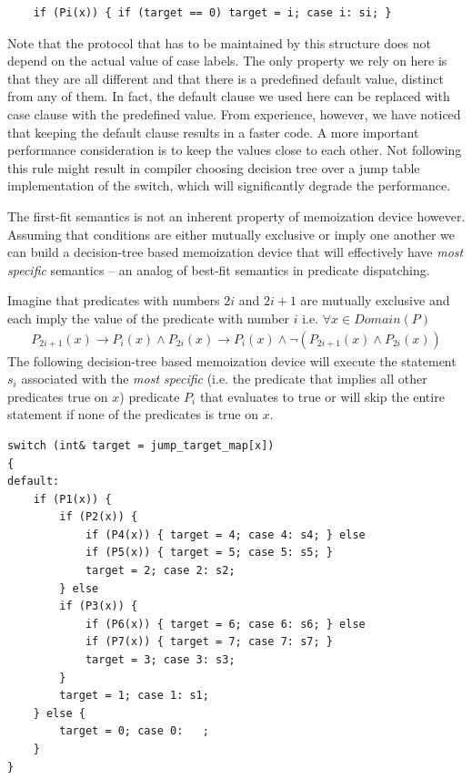 \documentclass[preprint]{sigplanconf}
\begin{document}
\begin{lstlisting}
    if (Pi(x)) { if (target == 0) target = i; case i: si; }
\end{lstlisting}

\noindent
Note that the protocol that has to be maintained by this structure does not 
depend on the actual value of case labels. The only property we rely on here is 
that they are all different and that there is a predefined default value, 
distinct from any of them. In fact, the default clause we used here can be 
replaced with case clause with the predefined value. From experience, however, 
we have noticed that keeping the default clause results in a faster code. A more 
important performance consideration is to keep the values close to each other. 
Not following this rule might result in compiler choosing decision tree over a 
jump table implementation of the switch, which will significantly degrade the 
performance.

The first-fit semantics is not an inherent property of memoization device however. 
Assuming that conditions are either mutually exclusive or imply one another we 
can build a decision-tree based memoization device that will effectively have 
\emph{most specific} semantics -- an analog of best-fit semantics in predicate 
dispatching\cite{ErnstKC98}.

Imagine that predicates with numbers $2i$ and $2i+1$ are mutually exclusive and 
each imply the value of the predicate with number $i$ i.e. $\forall x \in Domain(P)$
\begin{eqnarray*}
P_{2i+1}(x)\rightarrow P_i(x) \wedge P_{2i}(x)\rightarrow P_i(x) \wedge \neg(P_{2i+1}(x) \wedge P_{2i}(x))
\end{eqnarray*}
\noindent
The following decision-tree based memoization device will execute the statement 
$s_i$ associated with the \emph{most specific} (i.e. the predicate that implies 
all other predicates true on $x$) predicate $P_i$ that evaluates to true or will 
skip the entire statement if none of the predicates is true on $x$.

\begin{lstlisting}
switch (int& target = jump_target_map[x])
{
default:
    if (P1(x)) {
        if (P2(x)) {
            if (P4(x)) { target = 4; case 4: s4; } else
            if (P5(x)) { target = 5; case 5: s5; } 
            target = 2; case 2: s2;
        } else
        if (P3(x)) {
            if (P6(x)) { target = 6; case 6: s6; } else
            if (P7(x)) { target = 7; case 7: s7; } 
            target = 3; case 3: s3;
        }
        target = 1; case 1: s1;
    } else {
        target = 0; case 0:   ;
    }
}
\end{lstlisting}
\end{document}
